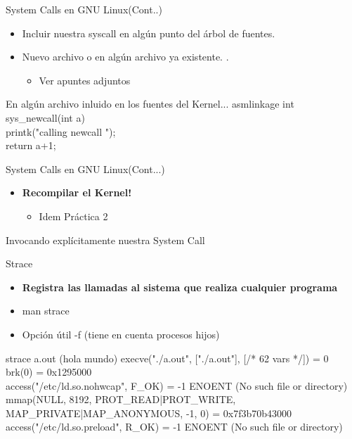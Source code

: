 \begin{frame}{System Calls en GNU Linux(Cont..)}
   \begin{itemize}  
   \item Incluir nuestra syscall en algún punto del árbol de fuentes. 
   \item Nuevo archivo o en algún archivo ya existente. .
    \begin{itemize}
	 \item \alert{Ver apuntes adjuntos} 
    \end{itemize}   
 \end{itemize}

\begin{block}{En algún archivo inluido en los fuentes del Kernel...}
asmlinkage int sys\_newcall(int a) { \\
	printk("calling newcall ");   \\
return a+1; \\
}
\end{block}
\end{frame}

\begin{frame}{System Calls en GNU Linux(Cont...)}
   \begin{itemize}  
   \item \textbf{Recompilar el Kernel!}
    \begin{itemize}
	 \item Idem Práctica 2 
    \end{itemize}   
 \end{itemize}
\end{frame}

\begin{frame}{Invocando explícitamente nuestra System Call}
\end{frame}

\begin{frame}{Strace}
   \begin{itemize}  
    \item \textbf{Registra las llamadas al sistema que realiza cualquier programa}
    \item man strace
    \item Opción útil -f (tiene en cuenta procesos hijos)  
 \end{itemize}
\begin{block}{strace a.out (hola mundo)}
execve("./a.out", ["./a.out"], [/* 62 vars */]) = 0 \\
brk(0)                                  = 0x1295000 \\
access("/etc/ld.so.nohwcap", F\_OK)      = -1 ENOENT (No such file or directory)\\
mmap(NULL, 8192, PROT\_READ|PROT\_WRITE, MAP\_PRIVATE|MAP\_ANONYMOUS, -1, 0) = 0x7f3b70b43000\\
access("/etc/ld.so.preload", R\_OK)      = -1 ENOENT (No such file or directory)\\

\end{block}
\end{frame}



